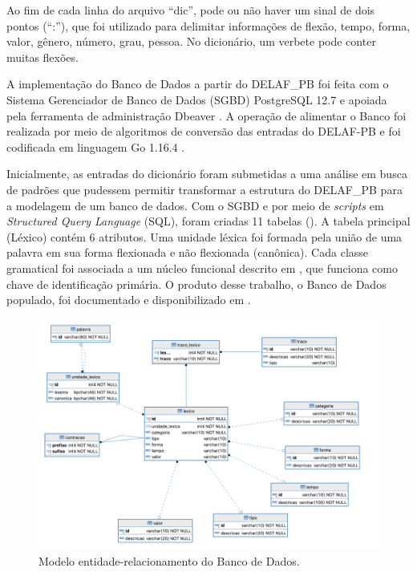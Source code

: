 \documentclass[portuguese]{textolivre}
\begin{document}
Ao fim de cada linha do arquivo “dic”, pode ou não haver um sinal de dois pontos (“:”), que foi utilizado para delimitar informações de flexão, tempo, forma, valor, gênero, número, grau, pessoa. No dicionário, um verbete pode conter muitas flexões.

A implementação do Banco de Dados a partir do DELAF\_PB foi feita com o Sistema Gerenciador de Banco de Dados (SGBD) PostgreSQL 12.7 \cite{the_postgresql_global_development_group_postgresql_nodate} e apoiada pela ferramenta de administração Dbeaver \cite{community_dbeaver_dbeaver:_nodate}. A operação de alimentar o Banco foi realizada por meio de algoritmos de conversão das entradas do DELAF-PB \cite{muniz_delaf-pb:_2015} e foi codificada em linguagem Go 1.16.4 \cite{the_go_authors_golang_nodate}.

Inicialmente, as entradas do dicionário foram submetidas a uma análise em busca de padrões que pudessem permitir transformar a estrutura do DELAF\_PB para a modelagem de um banco de dados. Com o SGBD e por meio de \textit{scripts} em \textit{Structured Query Language} (SQL), foram criadas 11 tabelas (). A tabela principal (Léxico) contém 6 atributos. Uma unidade léxica foi formada pela união de uma palavra em sua forma flexionada e não flexionada (canônica). Cada classe gramatical foi associada a um núcleo funcional descrito em \textcite[p. 141]{othero_gramatica_2009}, que funciona como chave de identificação primária. O produto desse trabalho, o Banco de Dados populado, foi documentado e disponibilizado em \cite{pacheco_banco_2021}.

\begin{figure}[h!]
 \centering
 \includegraphics[width=\textwidth]{Fig2.png}
 \caption{Modelo entidade-relacionamento do Banco de Dados.}
 \label{fig2}
\end{figure}
\end{document}
